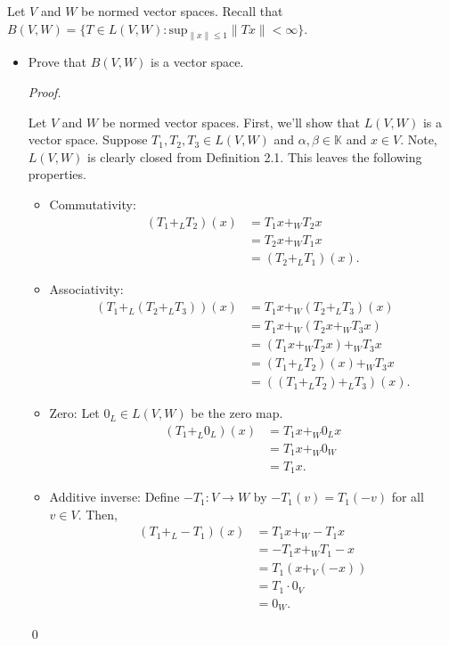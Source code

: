 \documentclass[12pt]{article}
\newenvironment{problem}[2][Problem]{\begin{trivlist}
\item[\hskip \labelsep {\bfseries #1}\hskip \labelsep {\bfseries
#2.}]}{\end{trivlist}}
\newenvironment{sol}
    {\emph{Proof.}
    }
    {
    \qed
    }
\begin{document}
\begin{problem}{4}
Let $V$ and $W$ be normed vector spaces. Recall that $B(V,W) = \{T \in L(V,W) : \text{sup}_{\lVert x \rVert \leq 1} \lVert Tx \rVert < \infty\}$. 

\begin{itemize}
\item[(a)] Prove that $B(V,W)$ is a vector space.

\begin{sol}
Let $V$ and $W$ be normed vector spaces. First, we'll show that $L(V,W)$ is a vector space. Suppose $T_1,T_2,T_3 \in L(V,W)$ and $\alpha, \beta \in \mathbb{K}$ and $x \in V$. Note, $L(V,W)$ is clearly closed from Definition 2.1. This leaves the following properties. \begin{itemize}
    \item[(1)] Commutativity: \begin{align*}
        (T_1 +_L T_2)(x) &= T_1x +_W T_2x \tag*{(Addition on $L(V,W)$)} \\ &= T_2x +_W T_1x \tag*{(Commutativity of addition in $W$)} \\ &= (T_2 +_L T_1)(x). \tag*{(Addition on $L(V,W)$)}
    \end{align*}
    \item[(2)] Associativity: \begin{align*}
        (T_1 +_L (T_2 +_L T_3))(x) &= T_1x +_W (T_2 +_L T_3)(x) \tag*{(Addition on $L(V,W)$)} \\ &= T_1x +_W (T_2x +_W T_3x) \tag*{(Addition on $L(V,W)$)} \\ &= (T_1x +_W T_2x) +_W T_3x \tag*{(Associativity in $W$)} \\ &= (T_1 +_L T_2)(x) +_W T_3x \tag*{(Addition on $L(V,W)$)} \\ &= ((T_1 +_L T_2) +_L T_3)(x). \tag*{(Addition on $L(V,W)$)}
    \end{align*}
    \item[(3)] Zero:  Let $0_L \in L(V,W)$ be the zero map. \begin{align*}
        (T_1 +_L 0_L)(x) &= T_1x +_W 0_Lx  \tag*{(Addition on $L(V,W)$)} \\ &= T_1x +_W 0_W \tag*{(Definition of zero map)} \\ &= T_1x. \tag*{(Addition of $0_W$)}
    \end{align*}
    \item[(4)] Additive inverse: Define $-T_1:V \to W$ by $-T_1(v) = T_1(-v)$ for all $v \in V$. Then, \begin{align*}
        (T_1 +_L -T_1)(x) &= T_1x +_W -T_1x \\ &= -T_1x +_W T_1-x \\ &= T_1(x +_V(-x))  \tag*{(Linearity of $T_1$)} \\ &= T_1 \cdot 0_V \tag*{(Addititive inverse in $V$)} \\ &= 0_W. \tag*{(Linearity of $T_1$)}

\end{align*}
\end{itemize}
\end{sol}
\end{itemize}
\end{problem}
\end{document}
